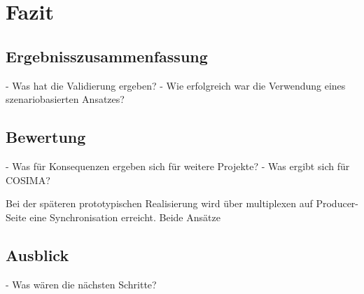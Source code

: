\chapter{Fazit} %
\label{cha:fazit}

\section{Ergebnisszusammenfassung} %
\label{sec:ergebnisszusammenfassung}

  - Was hat die Validierung ergeben?
  - Wie erfolgreich war die Verwendung eines szenariobasierten Ansatzes?


\section{Bewertung} %
\label{sec:bewertung}

- Was für Konsequenzen ergeben sich für weitere Projekte?
- Was ergibt sich für COSIMA?

Bei der späteren prototypischen Realisierung wird über multiplexen auf Producer-Seite eine Synchronisation erreicht. Beide Ansätze


\section{Ausblick} %
\label{sec:ausblick}

  - Was wären die nächsten Schritte?


